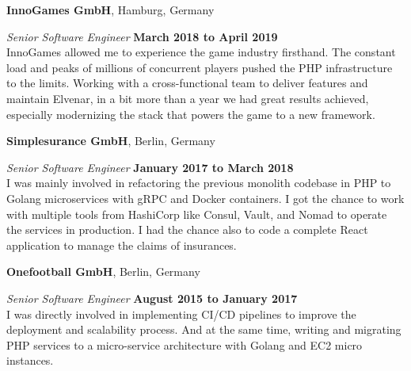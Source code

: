 \documentclass[12pt]{article}
\newcommand{\halfblankline}{\quad\vspace{-0.5\baselineskip}\pagebreak[3]}
\begin{document}
\halfblankline

\halfblankline

\textbf{InnoGames GmbH},
Hamburg, Germany
\begin{outerlist}

    \item[] \textit{Senior Software Engineer}%
            \hfill \textbf{March 2018 to April 2019}\\
            InnoGames allowed me to experience the game industry firsthand. The constant load and peaks of millions of concurrent players pushed the PHP infrastructure to the limits. Working with a cross-functional team to deliver features and maintain Elvenar, in a bit more than a year we had great results achieved, especially modernizing the stack that powers the game to a new framework.
            
\end{outerlist}

\halfblankline

\textbf{Simplesurance GmbH},
Berlin, Germany
\begin{outerlist}

    \item[] \textit{Senior Software Engineer}%
            \hfill \textbf{January 2017 to March 2018}\\
            I was mainly involved in refactoring the previous monolith codebase in PHP to Golang microservices with gRPC and Docker containers. I got the chance to work with multiple tools from HashiCorp like Consul, Vault, and Nomad to operate the services in production. I had the chance also to code a complete React application to manage the claims of insurances.
            
\end{outerlist}

\halfblankline

\textbf{Onefootball GmbH},
Berlin, Germany
\begin{outerlist}

    \item[] \textit{Senior Software Engineer}%
            \hfill \textbf{August 2015 to January 2017}\\
            I was directly involved in implementing CI/CD pipelines to improve the deployment and scalability process. And at the same time, writing and migrating PHP services to a micro-service architecture with Golang and EC2 micro instances.
            
\end{outerlist}
\end{document}
